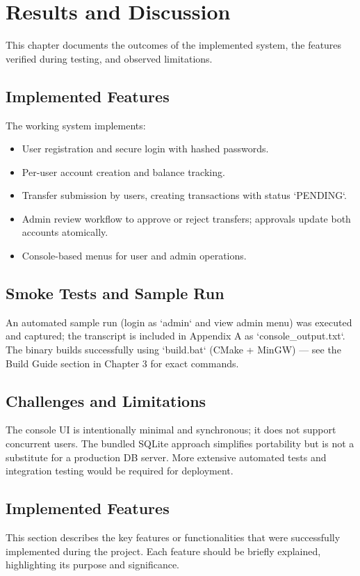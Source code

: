 \chapter{Results and Discussion}

This chapter documents the outcomes of the implemented system, the features verified during testing, and observed limitations.

\section{Implemented Features}
The working system implements:
\begin{itemize}
    \item User registration and secure login with hashed passwords.
    \item Per-user account creation and balance tracking.
    \item Transfer submission by users, creating transactions with status `PENDING`.
    \item Admin review workflow to approve or reject transfers; approvals update both accounts atomically.
    \item Console-based menus for user and admin operations.
\end{itemize}

\section{Smoke Tests and Sample Run}
An automated sample run (login as `admin` and view admin menu) was executed and captured; the transcript is included in Appendix A as `console_output.txt`. The binary builds successfully using `build.bat` (CMake + MinGW) — see the Build Guide section in Chapter 3 for exact commands.

\section{Challenges and Limitations}
The console UI is intentionally minimal and synchronous; it does not support concurrent users. The bundled SQLite approach simplifies portability but is not a substitute for a production DB server. More extensive automated tests and integration testing would be required for deployment.

\section{Implemented Features}
This section describes the key features or functionalities that were successfully implemented during the project. Each feature should be briefly explained, highlighting its purpose and significance.

